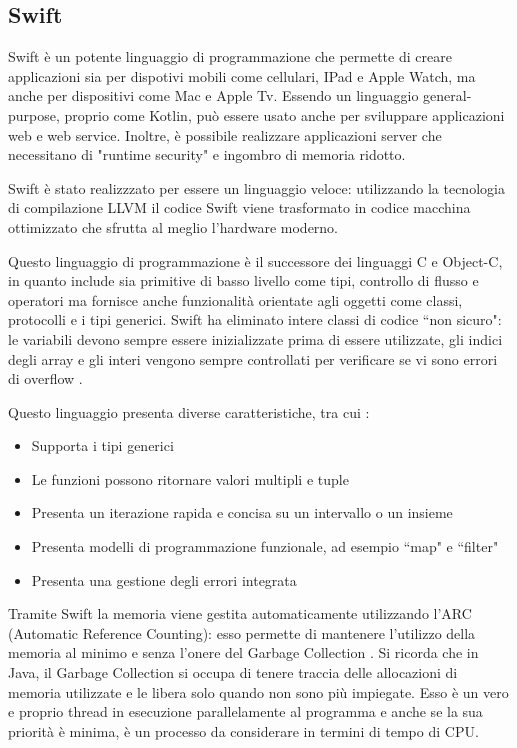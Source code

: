 \subsection{Swift}
Swift \`e un potente linguaggio di programmazione che permette di creare applicazioni sia per dispotivi mobili come cellulari,
IPad e Apple Watch, ma anche per dispositivi come Mac e Apple Tv.
Essendo un linguaggio general-purpose, proprio come Kotlin, pu\`o essere usato anche per sviluppare applicazioni web e web service. Inoltre, \`e possibile realizzare applicazioni server che
necessitano di "runtime security" e ingombro di memoria ridotto.

Swift \`e stato realizzzato per essere un linguaggio veloce: utilizzando la tecnologia di compilazione LLVM il codice Swift viene trasformato in codice macchina ottimizzato che sfrutta al meglio
l'hardware moderno.

Questo linguaggio di programmazione \`e il successore dei linguaggi C e Object-C, in quanto include sia primitive di basso livello come tipi,
controllo di flusso e operatori ma fornisce anche funzionalit\`a orientate agli oggetti come classi, protocolli e i tipi generici.
Swift ha eliminato intere classi di codice ``non sicuro": le variabili devono sempre essere inizializzate prima di essere utilizzate, gli indici degli array e gli interi
vengono sempre controllati per verificare se vi sono errori di overflow \cite{Apple:Com}.

Questo linguaggio presenta diverse caratteristiche, tra cui \cite{Apple:Swift}:
\begin{itemize}
      \item Supporta i tipi generici
      \item Le funzioni possono ritornare valori multipli e tuple
      \item Presenta un iterazione rapida e concisa su un intervallo o un insieme
      \item Presenta modelli di programmazione funzionale, ad esempio ``map" e ``filter"
      \item Presenta una gestione degli errori integrata
\end{itemize}

Tramite Swift la memoria viene gestita automaticamente utilizzando l'ARC {}(Automatic Reference Counting): esso permette di mantenere l'utilizzo della
memoria al minimo e senza l'onere del Garbage Collection \cite{GarbageCollector}. Si ricorda che in Java, il Garbage Collection si occupa di tenere traccia delle allocazioni di memoria utilizzate e le
libera solo quando non sono pi\`u impiegate. Esso \`e un vero e proprio thread in esecuzione parallelamente al programma e anche se la sua priorit\`a
\`e minima, \`e  un processo da considerare in termini di tempo di CPU.

